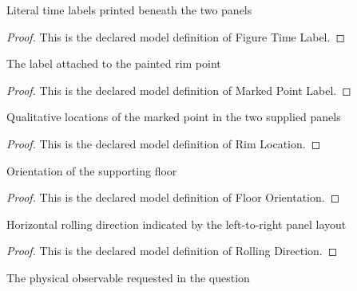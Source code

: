 \begin{definition}
  \label{def:physics:phyx-mini-0736:phyxminiproblems-problemphyxmini0736-figuretimelabel}
  Literal time labels printed beneath the two panels
\end{definition}
\begin{proof}
  This is the declared model definition of Figure Time Label.
\end{proof}
\begin{definition}
  \label{def:physics:phyx-mini-0736:phyxminiproblems-problemphyxmini0736-markedpointlabel}
  The label attached to the painted rim point
\end{definition}
\begin{proof}
  This is the declared model definition of Marked Point Label.
\end{proof}
\begin{definition}
  \label{def:physics:phyx-mini-0736:phyxminiproblems-problemphyxmini0736-rimlocation}
  Qualitative locations of the marked point in the two supplied panels
\end{definition}
\begin{proof}
  This is the declared model definition of Rim Location.
\end{proof}
\begin{definition}
  \label{def:physics:phyx-mini-0736:phyxminiproblems-problemphyxmini0736-floororientation}
  Orientation of the supporting floor
\end{definition}
\begin{proof}
  This is the declared model definition of Floor Orientation.
\end{proof}
\begin{definition}
  \label{def:physics:phyx-mini-0736:phyxminiproblems-problemphyxmini0736-rollingdirection}
  Horizontal rolling direction indicated by the left-to-right panel layout
\end{definition}
\begin{proof}
  This is the declared model definition of Rolling Direction.
\end{proof}
\begin{definition}
  \label{def:physics:phyx-mini-0736:phyxminiproblems-problemphyxmini0736-requestedobservable}
  The physical observable requested in the question
\end{definition}
